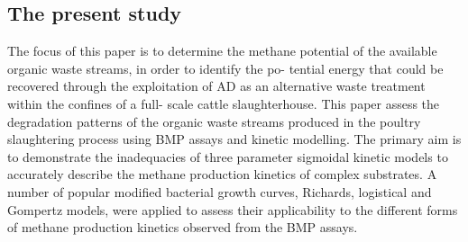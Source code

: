 \subsection{The present study}
The focus of this paper is to determine the methane potential of the available organic waste streams, in order to identify the po- tential energy that could be recovered through the exploitation of AD as an alternative waste treatment within the confines of a full- scale cattle slaughterhouse. This paper assess the degradation patterns of the organic waste streams produced in the poultry slaughtering process using BMP assays and kinetic modelling. The primary aim is to demonstrate the inadequacies of three parameter sigmoidal kinetic models to accurately describe the methane production kinetics of complex substrates. A number of popular modified bacterial growth curves, Richards, logistical and Gompertz models, were applied to assess their applicability to the different forms of methane production kinetics observed from the BMP assays.